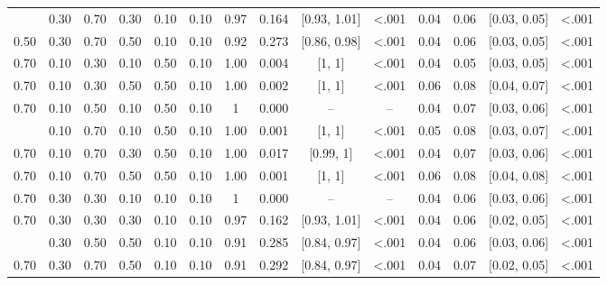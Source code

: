 \documentclass[
  11pt,
]{article}
\begin{document}
\begin{landscape}
\begin{ThreePartTable}
\begin{longtable}[t]{cccccccccccccc}
\addlinespace
0.50 & 0.30 & 0.70 & 0.30 & 0.10 & 0.10 & 0.97 & 0.164 & {}[0.93, 1.01] & <.001 & 0.04 & 0.06 & {}[0.03, 0.05] & <.001\\
0.50 & 0.30 & 0.70 & 0.50 & 0.10 & 0.10 & 0.92 & 0.273 & {}[0.86, 0.98] & <.001 & 0.04 & 0.06 & {}[0.03, 0.05] & <.001\\
0.70 & 0.10 & 0.30 & 0.10 & 0.50 & 0.10 & 1.00 & 0.004 & {}[1, 1] & <.001 & 0.04 & 0.05 & {}[0.03, 0.05] & <.001\\
0.70 & 0.10 & 0.30 & 0.50 & 0.50 & 0.10 & 1.00 & 0.002 & {}[1, 1] & <.001 & 0.06 & 0.08 & {}[0.04, 0.07] & <.001\\
0.70 & 0.10 & 0.50 & 0.10 & 0.50 & 0.10 & 1 & 0.000 & {} – & – & 0.04 & 0.07 & {}[0.03, 0.06] & <.001\\
\addlinespace
0.70 & 0.10 & 0.70 & 0.10 & 0.50 & 0.10 & 1.00 & 0.001 & {}[1, 1] & <.001 & 0.05 & 0.08 & {}[0.03, 0.07] & <.001\\
0.70 & 0.10 & 0.70 & 0.30 & 0.50 & 0.10 & 1.00 & 0.017 & {}[0.99, 1] & <.001 & 0.04 & 0.07 & {}[0.03, 0.06] & <.001\\
0.70 & 0.10 & 0.70 & 0.50 & 0.50 & 0.10 & 1.00 & 0.001 & {}[1, 1] & <.001 & 0.06 & 0.08 & {}[0.04, 0.08] & <.001\\
0.70 & 0.30 & 0.30 & 0.10 & 0.10 & 0.10 & 1 & 0.000 & {} – & – & 0.04 & 0.06 & {}[0.03, 0.06] & <.001\\
0.70 & 0.30 & 0.30 & 0.30 & 0.10 & 0.10 & 0.97 & 0.162 & {}[0.93, 1.01] & <.001 & 0.04 & 0.06 & {}[0.02, 0.05] & <.001\\
\addlinespace
0.70 & 0.30 & 0.50 & 0.50 & 0.10 & 0.10 & 0.91 & 0.285 & {}[0.84, 0.97] & <.001 & 0.04 & 0.06 & {}[0.03, 0.06] & <.001\\
0.70 & 0.30 & 0.70 & 0.50 & 0.10 & 0.10 & 0.91 & 0.292 & {}[0.84, 0.97] & <.001 & 0.04 & 0.07 & {}[0.02, 0.05] & <.001\\*
\end{longtable}
\end{ThreePartTable}

\end{landscape}

\renewcommand{\thetable}{C2}
\end{document}
